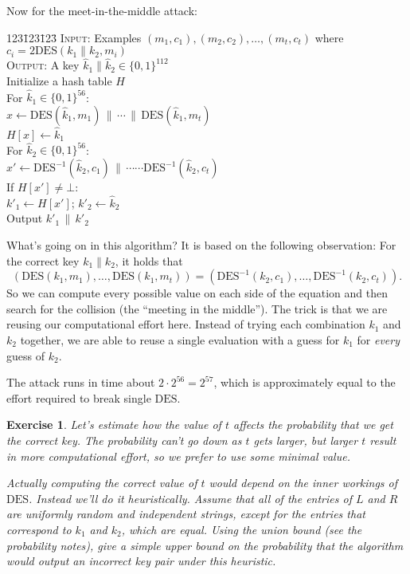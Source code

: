 \documentclass[11pt]{article}
\newtheorem{exercise}{Exercise}
\newcommand{\concat}{{\,\|\,}}
\newcommand{\bits}{\{0,1\}}
\newcommand{\des}{\mathrm{DES}}
\newcommand{\twodes}{\mathrm{2DES}}
\begin{document}
Now for the meet-in-the-middle attack:
\begin{tabbing}123\=123\=123\=\kill
    \> \textsc{Input}: Examples $(m_1,c_1),(m_2,c_2),\ldots,(m_t,c_t)$ where
    $c_i=\twodes(k_1\|k_2,m_i)$\\
    \> \textsc{Output}: A key $\hat{k}_1\|\hat{k}_2\in\bits^{112}$\\
    \> Initialize a hash table $H$\\
    \> For $\hat{k}_1\in\bits^{56}$:\\
    \> \> $x \gets \des(\hat{k}_1,m_1)\concat \cdots \concat \des(\hat{k}_1,m_t)$\\
    \> \> $H[x] \gets \hat{k}_1$\\
    \> For $\hat{k}_2\in\bits^{56}$:\\
    \> \> $x' \gets \des^{-1}(\hat{k}_2,c_1)\concat 
           \cdots\cdots \des^{-1}(\hat{k}_2,c_t)$\\
    \> \> If $H[x'] \neq \bot$:\\
    \> \> \> $k'_1 \gets H[x']$; $k'_2 \gets \hat{k}_2$\\
    \> \> \> Output $k'_1\concat k'_2$
\end{tabbing}
What's going on in this algorithm? It is based on the following observation:
For the correct key $k_1\|k_2$, it holds that
\[
    (\des(k_1,m_1),\ldots,\des(k_1,m_t)) = 
    (\des^{-1}(k_2,c_1),\ldots,\des^{-1}(k_2,c_t)).
\]
So we can compute every possible value on each side of the equation and then
search for the collision (the ``meeting in the middle''). The trick is that
we are reusing our computational effort here. Instead of trying each
combination $k_1$ and $k_2$ together, we are able to reuse a single
evaluation with a guess for $k_1$ for \emph{every} guess of $k_2$.

The attack runs in time about $2\cdot 2^{56}=2^{57}$, which is approximately
equal to the effort required to break single $\des$.

\begin{exercise}\label{ex:examples}
    Let's estimate how the value of $t$ affects the probability that
    we get the correct key. The probability can't go down as $t$
    gets larger, but larger $t$ result in more computational effort,
    so we prefer to use some minimal value.

    Actually computing the correct value of $t$ would depend on the
    inner workings of $\des$. Instead we'll do it heuristically.
    Assume that all of the entries of $L$ and $R$ are \emph{uniformly
    random and independent strings}, except for the entries that
    correspond to $k_1$ and $k_2$, which are equal. Using the union bound
    (see the probability notes), give a simple upper bound on the
    probability that the algorithm would output an incorrect key pair
    under this heuristic.
\end{exercise}
\end{document}
